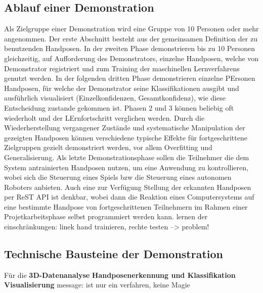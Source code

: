 \documentclass{article}
\begin{document}
\subsection {Ablauf einer Demonstration}
Als Zielgruppe einer Demonstration wird eine Gruppe von 10 Personen oder mehr angenommen. Der erste Abschnitt besteht aus der gemeinsamen Definition der 
zu benutzenden Handposen. In der zweiten Phase demonstrieren bis zu 10 Personen gleichzeitig, auf Aufforderung des Demonstrators, einzelne Handposen, welche von Demonstrator registriert 
und zum Training der maschinellen Lernverfahrens genutzt werden. In der folgenden dritten Phase demonstrieren einzelne PErsonen Handposen, für welche der Demonstrator seine Klassifikationen ausgibt und
ausführlich visualisiert (Einzelkonfidenzen, Gesamtkonfidenz), wie diese Entscheidung zustande gekommen ist. Phasen 2 und 3 können beliebig oft wiederholt und der LErnfortschritt verglichen werden. Durch die Wiederherstellung vergangener Zustände und systematische Manipulation der gezeigten Handposen können verschiedene typische Effekte für fortgeschrittene Zielgruppen gezielt demonstriert werden, vor allem Overfitting und Generalisierung. 
%
Als letzte Demonstrationsphase sollen die Teilnehmer die dem System antrainierten Handposen nutzen, um eine Anwendung zu kontrollieren, wobei sich
die Steuerung eines Spiels bzw die Steuerung eines autonomen Roboters anbieten. Auch eine zur Verfügung Stellung der erkannten Handposen per ReST API ist denkbar, 
wobei dann die Reaktion eines Computersystems auf eine bestimmte Handpose von fortgeschrittenen Teilnehmern im Rahmen einer Projetkarbeitsphase selbst programmiert werden kann.
%
lernen der einschränkungen: linek hand trainieren, rechte testen --> problem!
\subsection{Technische Bausteine der Demonstration}
Für die 
{\bf 3D-Datenanalyse}
{\bf Handposenerkennung und Klassifikation}
{\bf Visualisierung}
message: ist nur ein verfahren, keine Magie
%
\renewcommand{\thesection}{5}
\end{document}
